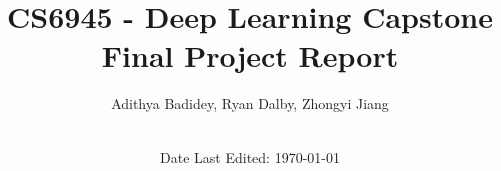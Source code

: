 \title{\Large CS6945 - Deep Learning Capstone \\[0.5cm]
        \bf\Large Final Project Report}
\author{\large Adithya Badidey, Ryan Dalby, Zhongyi Jiang\\ \ \\}
\date{\large Date Last Edited: \today}

\makeatletter
    \begin{titlepage}
        \begin{center}
	   {\ \\ \ \\}
        \vbox{}\vspace{5cm}
            {\@title }\\[3cm] 
            {\@author}
            {\@date\\}

        \end{center}
    \end{titlepage}
\makeatother